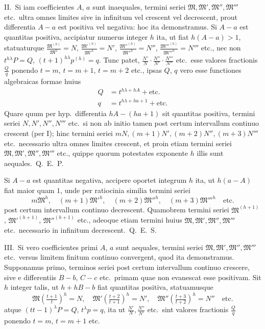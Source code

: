\documentclass[12pt,a4paper]{article}
\begin{document}
II.\ Si iam coefficientes $A$, $a$ sunt inaequales, termini seriei $\mathfrak{M}, \mathfrak{M}', \mathfrak{M}'', \mathfrak{M}'''$ etc.\ ultra omnes limites sive in infinitum vel crescent vel decrescent, prout differentia $A-a$ est positiva vel negativa: hoc ita demonstramus. Si $A-a$ est quantitas positiva, accipiatur numerus integer $h$ ita, ut fiat $h(A-a)>1$, statuaturque $\frac{\mathfrak{M}^{(h)}}{\mathfrak{M}^h}=N$, $\frac{\mathfrak{M}'^{(h)}}{\mathfrak{M}'^h}=N'$, $\frac{\mathfrak{M}''^{(h)}}{\mathfrak{M}''^h}=N''$, $\frac{\mathfrak{M}'''^{(h)}}{\mathfrak{M}'''^h}=N'''$ etc., nec non $t^{h\lambda}P = Q$, $(t+1)^{h\lambda}p^{(h)} = q$. Tunc patet, $\frac{N'}{N}\cdot\frac{N''}{N'}\cdot\frac{N'''}{N''}$ etc.\ esse valores fractionis $\frac{Q}{q}$ ponendo $t=m$, $t=m+1$, $t=m+2$ etc., ipsas $Q$, $q$ vero esse functiones algebraicas formae huius
\begin{align*}
Q &= t^{h\lambda+hA} + \text{etc.}\\
q &= t^{h\lambda+ha+1} + \text{etc.}
\end{align*}
Quare quum per hyp.\ differentia $hA-(ha+1)$ sit quantitas positiva, termini seriei $N, N', N'', N'''$ etc.\ si non ab initio tamen post certum intervallum continuo crescent (per I); hinc termini seriei $mN, (m+1)N', (m+2)N'', (m+3)N'''$ etc.\ necessario ultra omnes limites crescent, et proin etiam termini seriei $\mathfrak{M}, \mathfrak{M}', \mathfrak{M}'', \mathfrak{M}'''$ etc., quippe quorum potestates exponente $h$ illis sunt aequales.\ Q.\ E.\ P.

Si $A-a$ est quantitas negativa, accipere oportet integrum $h$ ita, ut $h(a-A)$ fiat maior quam $1$, unde per ratiocinia similia termini seriei
\[
m\mathfrak{M}^h,\quad (m+1)\mathfrak{M}'^h,\quad (m+2)\mathfrak{M}''^h,\quad (m+3)\mathfrak{M}'''^h \quad \text{etc.}
\]
post certum intervallum continuo decrescent. Quamobrem termini seriei $\mathfrak{M}^{(h+1)}$, $\mathfrak{M}'^{(h+1)}$, $\mathfrak{M}''^{(h+1)}$ etc., adeoque etiam termini huius $\mathfrak{M}, \mathfrak{M}', \mathfrak{M}'', \mathfrak{M}'''$ etc.\ necessario in infinitum decrescent.\ Q.\ E.\ S.

III.\ Si vero coefficientes primi $A$, $a$ sunt aequales, termini seriei $\mathfrak{M}, \mathfrak{M}', \mathfrak{M}'', \mathfrak{M}'''$ etc.\ versus limitem finitum continuo convergent, quod ita demonstramus. Supponamus primo, terminos seriei post certum intervallum continuo crescere, sive e differentiis $B-b$, $C-c$ etc.\ primam quae non evanescat esse positivam. Sit $h$ integer talis, ut $h+hB-b$ fiat quantitas positiva, statuamusque
\[
\mathfrak{M}(\tfrac{t+1}{t})^{\!h}=N,\quad \mathfrak{M}'(\tfrac{t+2}{t+1})^{\!h}=N',\quad \mathfrak{M}''(\tfrac{t+3}{t+2})^{\!h}=N'' \quad \text{etc.}
\]
atque $(tt-1)^{\lambda}P = Q$, $t^{\lambda}p = q$, ita ut $\frac{N'}{N}, \frac{N''}{N'}$ etc.\ sint valores fractionis $\frac{Q}{q}$ ponendo $t=m$, $t=m+1$ etc.
\end{document}
